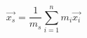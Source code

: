\documentclass{article}
\begin{document}
\begin{equation*}
\vec{x_s} = \frac{1}{m_s} \sum_{i = 1}^{n} m_i \vec{x_i}
\end{equation*}
\end{document}
